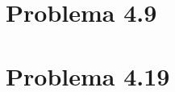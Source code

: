 \documentclass{article}
\begin{document}

\section*{Problema 4.9}

% 
% 
% 
% 


\section*{Problema 4.19}
\end{document}

